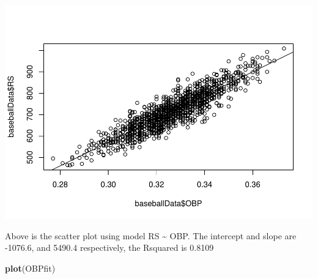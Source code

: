 \documentclass[
]{article}
\newenvironment{Shaded}{\begin{snugshade}}{\end{snugshade}}
\newcommand{\KeywordTok}[1]{\textcolor[rgb]{0.13,0.29,0.53}{\textbf{#1}}}
\newcommand{\NormalTok}[1]{#1}
\begin{document}
\includegraphics{HW2_Liu-Zi-Jian_files/figure-latex/unnamed-chunk-35-1.pdf}

Above is the scatter plot using model RS \textasciitilde{} OBP. The
intercept and slope are -1076.6, and 5490.4 respectively, the Rsquared
is 0.8109

\begin{Shaded}
\begin{Highlighting}[]
\KeywordTok{plot}\NormalTok{(OBPfit)}
\end{Highlighting}
\end{Shaded}
\end{document}
